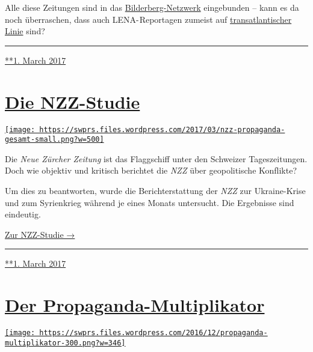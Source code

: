 Alle diese Zei­tungen sind in das
\href{https://swprs.files.wordpress.com/2016/07/bilderberg_teilnehmer_1954-2014.pdf}{Bilder­berg-Netz­werk}
ein­ge­bun­den -- kann es da noch über­raschen, dass auch
LENA- Repor­ta­gen zumeist auf
\href{http://www.tagesanzeiger.ch/ausland/europa/Wer-sagt-was-er-denkt-nobrriskiert-allesnobr/story/17225010}{trans­at­lan­tischer
Linie} sind?

\begin{center}\rule{0.5\linewidth}{\linethickness}\end{center}

\href{https://swprs.org/2017/03/01/warum-der-tagesanzeiger-nichts-verpasst/}{**1.
March 2017}

\hypertarget{die-nzz-studie}{%
\section{\texorpdfstring{\href{https://swprs.org/2017/03/01/die-nzz-studie/}{Die
NZZ-Studie}}{Die NZZ-Studie}}\label{die-nzz-studie}}

\href{https://swprs.org/2017/03/01/die-nzz-studie/}{\texttt{[image: https://swprs.files.wordpress.com/2017/03/nzz-propaganda-gesamt-small.png?w=500]}}

Die \emph{Neue Zürcher Zeitung} ist das Flagg­schiff unter den Schweizer
Tages­zei­tungen. Doch wie objektiv und kritisch berichtet die
\emph{NZZ} über geo­politische Konf‌likte?

Um dies zu be­ant­worten, wurde die Bericht­erstattung der \emph{NZZ}
zur Ukraine-Krise und zum Syrien­krieg während je eines Monats
unter­sucht. Die Ergebnisse sind eindeutig.

\href{https://swprs.org/die-nzz-studie/}{Zur NZZ-Studie →}

\begin{center}\rule{0.5\linewidth}{\linethickness}\end{center}

\href{https://swprs.org/2017/03/01/die-nzz-studie/}{**1. March 2017}

\hypertarget{der-propaganda-multiplikator}{%
\section{\texorpdfstring{\href{https://swprs.org/2017/03/01/propaganda-multiplikator/}{Der
Propaganda-Multiplikator}}{Der Propaganda-Multiplikator}}\label{der-propaganda-multiplikator}}

\href{https://swprs.org/2017/03/01/propaganda-multiplikator/}{\texttt{[image: https://swprs.files.wordpress.com/2016/12/propaganda-multiplikator-300.png?w=346]}}

